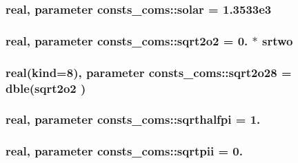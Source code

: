 \subsubsection[{\texorpdfstring{solar}{solar}}]{\setlength{\rightskip}{0pt plus 5cm}real, parameter consts\+\_\+coms\+::solar = 1.\+3533e3}\hypertarget{namespaceconsts__coms_a0f6603824548cc6136bef94ed0686ba1}{}\label{namespaceconsts__coms_a0f6603824548cc6136bef94ed0686ba1}
\subsubsection[{\texorpdfstring{sqrt2o2}{sqrt2o2}}]{\setlength{\rightskip}{0pt plus 5cm}real, parameter consts\+\_\+coms\+::sqrt2o2 = 0. $\ast$ {\bf srtwo}}\hypertarget{namespaceconsts__coms_a21cd110a4618508e5aabb43b56aa56d6}{}\label{namespaceconsts__coms_a21cd110a4618508e5aabb43b56aa56d6}
\subsubsection[{\texorpdfstring{sqrt2o28}{sqrt2o28}}]{\setlength{\rightskip}{0pt plus 5cm}real(kind=8), parameter consts\+\_\+coms\+::sqrt2o28 = dble({\bf sqrt2o2} )}\hypertarget{namespaceconsts__coms_a48b8676172e0d996bb646f8bd0d01e26}{}\label{namespaceconsts__coms_a48b8676172e0d996bb646f8bd0d01e26}
\subsubsection[{\texorpdfstring{sqrthalfpi}{sqrthalfpi}}]{\setlength{\rightskip}{0pt plus 5cm}real, parameter consts\+\_\+coms\+::sqrthalfpi = 1.}\hypertarget{namespaceconsts__coms_a8b1886af4e49f971a141bf7eeb315fa6}{}\label{namespaceconsts__coms_a8b1886af4e49f971a141bf7eeb315fa6}
\subsubsection[{\texorpdfstring{sqrtpii}{sqrtpii}}]{\setlength{\rightskip}{0pt plus 5cm}real, parameter consts\+\_\+coms\+::sqrtpii = 0.}\hypertarget{namespaceconsts__coms_a7ccaba833293a307822d6d2e4e58b992}{}\label{namespaceconsts__coms_a7ccaba833293a307822d6d2e4e58b992}
